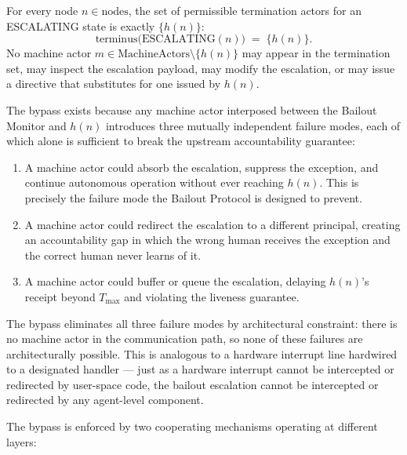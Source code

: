 \begin{definition}\label{def:bypass}
For every node $n \in \text{nodes}$, the set of permissible termination actors for an ESCALATING state is exactly $\{h(n)\}$:
\begin{equation}
\text{terminus}\bigl(\text{ESCALATING}(n)\bigr) \;=\; \{h(n)\}. \tag{BP}
\end{equation}
No machine actor $m \in \text{MachineActors} \setminus \{h(n)\}$ may appear in the termination set, may inspect the escalation payload, may modify the escalation, or may issue a directive that substitutes for one issued by $h(n)$.
\end{definition}

The bypass exists because any machine actor interposed between the Bailout Monitor and $h(n)$ introduces three mutually independent failure modes, each of which alone is sufficient to break the upstream accountability guarantee:

\begin{enumerate}
\item[\textbf{Intercept.}] A machine actor could absorb the escalation, suppress the exception, and continue autonomous operation without ever reaching $h(n)$. This is precisely the failure mode the Bailout Protocol is designed to prevent.

\item[\textbf{Redirect.}] A machine actor could redirect the escalation to a different principal, creating an accountability gap in which the wrong human receives the exception and the correct human never learns of it.

\item[\textbf{Delay.}] A machine actor could buffer or queue the escalation, delaying $h(n)$'s receipt beyond $T_{\text{max}}$ and violating the liveness guarantee.
\end{enumerate}

The bypass eliminates all three failure modes by architectural constraint: there is no machine actor in the communication path, so none of these failures are architecturally possible. This is analogous to a hardware interrupt line hardwired to a designated handler — just as a hardware interrupt cannot be intercepted or redirected by user-space code, the bailout escalation cannot be intercepted or redirected by any agent-level component.

The bypass is enforced by two cooperating mechanisms operating at different layers:

